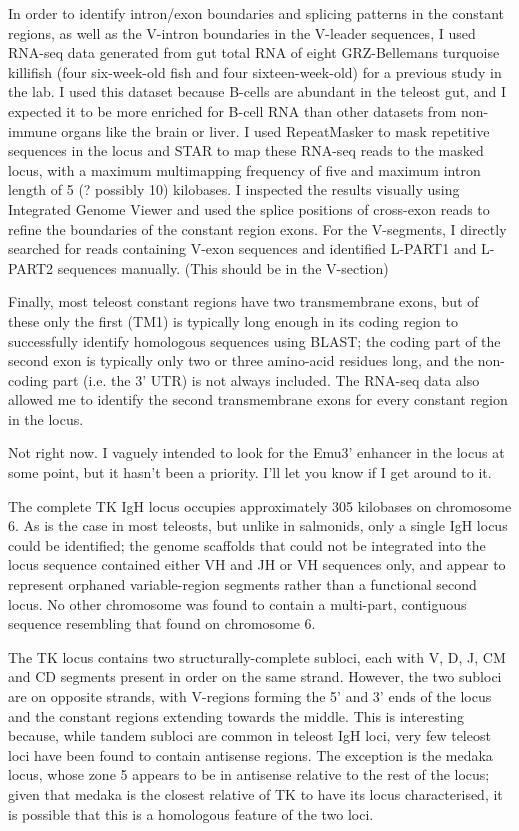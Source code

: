 In order to identify intron/exon boundaries and splicing patterns in the constant regions, as well as the V-intron boundaries in the V-leader sequences, I used RNA-seq data generated from gut total RNA of eight GRZ-Bellemans turquoise killifish (four six-week-old fish and four sixteen-week-old) for a previous study in the lab. I used this dataset because B-cells are abundant in the teleost gut, and I expected it to be more enriched for B-cell RNA than other datasets from non-immune organs like the brain or liver. I used RepeatMasker to mask repetitive sequences in the locus and STAR to map these RNA-seq reads to the masked locus, with a maximum multimapping frequency of five and maximum intron length of 5 (? possibly 10) kilobases. I inspected the results visually using Integrated Genome Viewer and used the splice positions of cross-exon reads to refine the boundaries of the constant region exons. For the V-segments, I directly searched for reads containing V-exon sequences and identified L-PART1 and L-PART2 sequences manually. (This should be in the V-section)

Finally, most teleost constant regions have two transmembrane exons, but of these only the first (TM1) is typically long enough in its coding region to successfully identify homologous sequences using BLAST; the coding part of the second exon is typically only two or three amino-acid residues long, and the non-coding part (i.e. the 3' UTR) is not always included. The RNA-seq data also allowed me to identify the second transmembrane exons for every constant region in the locus.


Not right now. I vaguely intended to look for the Emu3' enhancer in the locus at some point, but it hasn't been a priority. I'll let you know if I get around to it.


The complete TK IgH locus occupies approximately 305 kilobases on chromosome 6. As is the case in most teleosts, but unlike in salmonids, only a single IgH locus could be identified; the genome scaffolds that could not be integrated into the locus sequence contained either VH and JH or VH sequences only, and appear to represent orphaned variable-region segments rather than a functional second locus. No other chromosome was found to contain a multi-part, contiguous sequence resembling that found on chromosome 6. 

The TK locus contains two structurally-complete subloci, each with V, D, J, CM and CD segments present in order on the same strand. However, the two subloci are on opposite strands, with V-regions forming the 5' and 3' ends of the locus and the constant regions extending towards the middle. This is interesting because, while tandem subloci  are common in teleost IgH loci, very few teleost loci have been found to contain antisense regions. The exception is the medaka locus, whose zone 5 appears to be in antisense relative to the rest of the locus; given that medaka is the closest relative of TK to have its locus characterised, it is possible that this is a homologous feature of the two loci.

